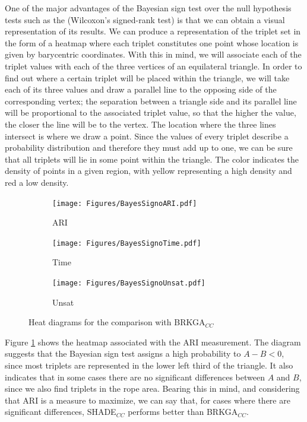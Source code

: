 \documentclass[review]{elsarticle}
\begin{document}
One of the major advantages of the Bayesian sign test over the null hypothesis tests such as the (Wilcoxon's signed-rank test) is that we can obtain a visual representation of its results. We can produce a representation of the triplet set in the form of a heatmap where each triplet constitutes one point whose location is given by barycentric coordinates. With this in mind, we will associate each of the triplet values with each of the three vertices of an equilateral triangle. In order to find out where a certain triplet will be placed within the triangle, we will take each of its three values and draw a parallel line to the opposing side of the corresponding vertex; the separation between a triangle side and its parallel line will be proportional to the associated triplet value, so that the higher the value, the closer the line will be to the vertex. The location where the three lines intersect is where we draw a point. Since the values of every triplet describe a probability distribution and therefore they must add up to one, we can be sure that all triplets will lie in some point within the triangle. The color indicates the density of points in a given region, with yellow representing a high density and red a low density.

\begin{figure}[ht!]
	\centering
	\begin{subfigure}{.45\textwidth}
		\texttt{[image: Figures/BayesSignoARI.pdf]}
		\caption{ARI}
		\label{fig:bayesARI}
	\end{subfigure}
	\begin{subfigure}{.45\textwidth}
		\texttt{[image: Figures/BayesSignoTime.pdf]}
		\caption{Time}
		\label{fig:bayesTime}
	\end{subfigure}
	\begin{subfigure}{.45\textwidth}
		\texttt{[image: Figures/BayesSignoUnsat.pdf]}
		\caption{Unsat}
		\label{fig:bayesUnsat}
	\end{subfigure}
	\caption{Heat diagrams for the comparison with BRKGA$_{CC}$}
\end{figure}

Figure \ref{fig:bayesARI} shows the heatmap associated with the ARI measurement. The diagram suggests that the Bayesian sign test assigns a high probability to $A - B < 0$, since most triplets are represented in the lower left third of the triangle. It also indicates that in some cases there are no significant differences between $A$ and $B$, since we also find triplets in the rope area. Bearing this in mind, and considering that ARI is a measure to maximize, we can say that, for cases where there are significant differences, SHADE$_{CC}$ performs better than BRKGA$_{CC}$.
\end{document}
